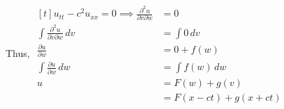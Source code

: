 \begin{enumerate}
    Thus, $\begin{aligned}[t]
        u_{tt} - c^2u_{xx} = 0 \implies
        \frac{\partial^2 u}{\partial v \partial w}           & = 0                     \\
        \int \frac{\partial^2 u}{\partial v \partial w} \,dv & = \int 0 \,dv           \\
        \frac{\partial u}{\partial w}                        & = 0 + f(w)              \\
        \int \frac{\partial u}{\partial w} \,dw              & = \int f(w) \,dw        \\
        u                                                    & = F(w) + g(v)           \\
                                                             & = F(x - ct) + g(x + ct)
    \end{aligned}$
\end{enumerate}